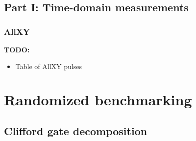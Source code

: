     \subsection{Part I: Time-domain measurements}
      \subsubsection{AllXY}
        \label{ssec:AllXY app}
        \textbf{TODO:}
        \begin{itemize}
          \item Table of AllXY pulses
        \end{itemize}
  \section{Randomized benchmarking}
    \subsection{Clifford gate decomposition}
      \label{ssec:Clifford gate decomposition}


